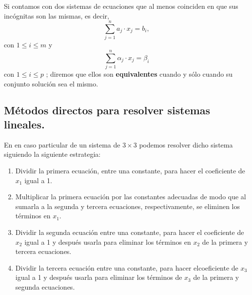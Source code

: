 \begin{defin}
Si contamos con dos sistemas de ecuaciones que al menos coinciden en que sus incógnitas son las mismas, es decir, 
\[\sum_{j=1}^n a_j \cdot x_j=b_i,\]
con $1 \leq  i \leq  m$ y
\[\sum_{j=1}^n \alpha_j \cdot x_j=\beta_i\]
con $1 \leq  i \leq  p$ ; diremos que ellos son \textbf{equivalentes} cuando
y sólo cuando su conjunto solución sea el mismo.
\end{defin}





\subsection{Métodos directos para resolver sistemas lineales.}

En en caso particular de un sistema de $3\times 3$ podemos resolver dicho sistema siguiendo la siguiente estrategia:
\begin{enumerate}
    \item Dividir la primera ecuación, entre una constante, para hacer el coeficiente de $x_1$ igual a 1.
    \item Multiplicar la primera ecuación por las constantes adecuadas de modo que al sumarla a la segunda y tercera ecuaciones, respectivamente, se eliminen los términos en $x_1$.
    \item Dividir la segunda ecuación entre una constante, para hacer el coeficiente de $x_2$ igual a 1 y después usarla para eliminar los términos en $x_2$ de la primera y tercera ecuaciones.
    \item Dividir la tercera ecuación entre una constante, para hacer elcoeficiente de $x_3$ igual a 1 y después usarla para eliminar los términos de $x_3$ de la primera y segunda ecuaciones.
\end{enumerate}



